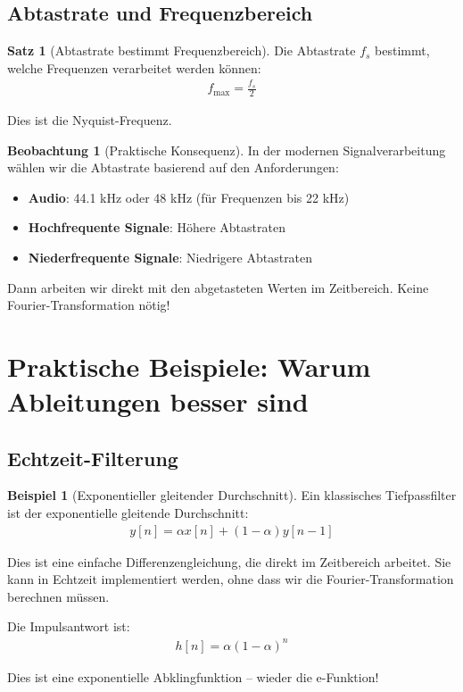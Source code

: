 ﻿\documentclass[a4paper,12pt]{report}
\theoremstyle{definition}
\newtheorem{beispiel}{Beispiel}
\newtheorem{satz}{Satz}
\newtheorem{beobachtung}{Beobachtung}
\begin{document}
	\subsection{Abtastrate und Frequenzbereich}
	
	\begin{satz}[Abtastrate bestimmt Frequenzbereich]
		
		Die Abtastrate $f_s$ bestimmt, welche Frequenzen verarbeitet werden können:
		\begin{align}
			f_{\max} = \frac{f_s}{2}
		\end{align}
		
		Dies ist die Nyquist-Frequenz.
	\end{satz}
	
	\begin{beobachtung}[Praktische Konsequenz]
		
		In der modernen Signalverarbeitung wählen wir die Abtastrate basierend auf den Anforderungen:
		\begin{itemize}
			\item[-] \textbf{Audio}: 44.1 kHz oder 48 kHz (für Frequenzen bis 22 kHz)
			\item[-] \textbf{Hochfrequente Signale}: Höhere Abtastraten
			\item[-] \textbf{Niederfrequente Signale}: Niedrigere Abtastraten
		\end{itemize}
		
		Dann arbeiten wir direkt mit den abgetasteten Werten im Zeitbereich. Keine Fourier-Transformation nötig!
	\end{beobachtung}
	
	\section{Praktische Beispiele: Warum Ableitungen besser sind}
	
	\subsection{Echtzeit-Filterung}
	
	\begin{beispiel}[Exponentieller gleitender Durchschnitt]
		
		Ein klassisches Tiefpassfilter ist der exponentielle gleitende Durchschnitt:
		\begin{align}
			y[n] = \alpha x[n] + (1 - \alpha) y[n-1]
		\end{align}
		
		Dies ist eine einfache Differenzengleichung, die direkt im Zeitbereich arbeitet. Sie kann in Echtzeit implementiert werden, ohne dass wir die Fourier-Transformation berechnen müssen.
		
		Die Impulsantwort ist:
		\begin{align}
			h[n] = \alpha (1 - \alpha)^n
		\end{align}
		
		Dies ist eine exponentielle Abklingfunktion -- wieder die e-Funktion!
	\end{beispiel}
	
\end{document}
